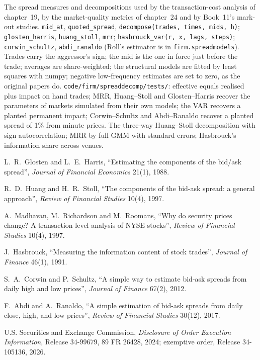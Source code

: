 \begin{build}
 The spread measures and decompositions used by the transaction-cost analysis of chapter~19, by the market-quality metrics of chapter~24
and by Book~11's mark-out studies.
 \texttt{mid\_at}, \texttt{quoted\_spread}, \texttt{decompose(trades, times, mids, h)}; \texttt{glosten\_harris}, \texttt{huang\_stoll},
\texttt{mrr}; \texttt{hasbrouck\_var(r, x, lags, steps)}; \texttt{corwin\_schultz}, \texttt{abdi\_ranaldo} (Roll's estimator is in
\texttt{firm.spreadmodels}).
 Trades carry the aggressor's sign; the mid is the one in force just before the trade; averages are share-weighted; the structural models
are fitted by least squares with numpy; negative low-frequency estimates are set to zero, as the original papers do.
 \texttt{code/firm/spreaddecomp/tests/}: effective equals realised plus impact on hand trades; MRR, Huang--Stoll and
Glosten--Harris recover the parameters of markets simulated from their own models; the VAR recovers a planted permanent impact; Corwin--Schultz and
Abdi--Ranaldo recover a planted spread of 1\% from minute prices.
 The three-way Huang--Stoll decomposition with sign autocorrelation; MRR by full GMM with standard errors; Hasbrouck's information share
across venues.
\end{build}

\begin{omsources}
\item L.~R.~Glosten and L.~E.~Harris, ``Estimating the components of the bid/ask spread'', \emph{Journal of Financial Economics} 21(1), 1988.
\item R.~D.~Huang and H.~R.~Stoll, ``The components of the bid-ask spread: a general approach'', \emph{Review of Financial Studies} 10(4), 1997.
\item A.~Madhavan, M.~Richardson and M.~Roomans, ``Why do security prices change? A transaction-level analysis of NYSE stocks'', \emph{Review of Financial
Studies} 10(4), 1997.
\item J.~Hasbrouck, ``Measuring the information content of stock trades'', \emph{Journal of Finance} 46(1), 1991.
\item S.~A.~Corwin and P.~Schultz, ``A simple way to estimate bid-ask spreads from daily high and low prices'', \emph{Journal of Finance} 67(2), 2012.
\item F.~Abdi and A.~Ranaldo, ``A simple estimation of bid-ask spreads from daily close, high, and low prices'', \emph{Review of Financial Studies} 30(12), 2017.
\item U.S. Securities and Exchange Commission, \emph{Disclosure of Order Execution Information}, Release 34-99679, 89 FR 26428, 2024; exemptive order,
Release 34-105136, 2026.
\end{omsources}

